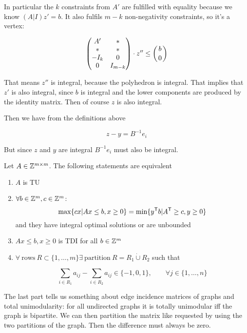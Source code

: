 \begin{pr}
In particular the $k$ constraints from $A'$ are fulfilled with equality because we know $(A|I)z'=b$. It also fulfils $m-k$ non-negativity constraints, so it's a vertex:

\[\begin{pmatrix}
A' & *\\
* & *\\
-I_k & 0 \\
0 & I_{m-k}
\end{pmatrix} \cdot z'' \leq \left(b \atop 0\right)\]

That means $z''$ is integral, because the polyhedron is integral. That implies that $z'$ is also integral, since $b$ is integral and the lower components are produced by the identity matrix. Then of course $z$ is also integral.

Then we have from the definitions above

\[z-y=B^{-1}e_i\]

But since $z$ and $y$ are integral $B^{-1}e_i$ must also be integral.

\end{pr}

\begin{thm} Let $A\in \mathbb{Z}^{m\times m}$. The following statements are equivalent
\begin{enumerate}
\item $A$ is TU
\item $\forall b \in \mathbb{Z}^m, c\in \mathbb{Z}^m$:
\[\max \{cx|Ax\leq b, x\geq 0\} = \min \{{y}^\text{\upshape \sffamily T} b|{A}^\text{\upshape \sffamily T} \geq c, y\geq 0\}\]
and they have integral optimal solutions or are unbounded
\item $Ax\leq b, x\geq 0$ is TDI for all $b\in \mathbb{Z}^m$
\item $\forall\ \text{rows}\ R\subset \{1,\ldots, m\} \exists\ \text{partition}\ R = R_1 \dot \cup R_2$ such that

\[\sum_{i\in R_1} a_{ij} - \sum_{i\in R_2} a_{ij} \in \{-1,0,1\}, \qquad \forall j\in \{1,\ldots, n\}\]
\end{enumerate}
\end{thm}

The last part tells us something about edge incidence matrices of graphs and total unimodularity: for all undirected graphs it is totally unimodular iff the graph is bipartite. We can then partition the matrix like requested by using the two partitions of the graph. Then the difference must always be zero.